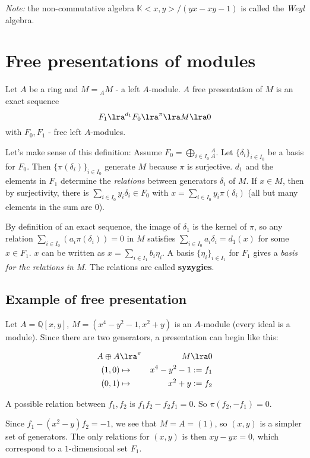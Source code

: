 \textit{Note:} the non-commutative algebra
$\mathbb{K}<x,y>/(yx-xy-1)$ is called the \textit{Weyl} algebra.

\section{Free presentations of modules}
Let $A$ be a ring and $M = {}_AM$ - a left $A$-module.
$A$ free presentation of $M$ is an exact sequence
\begin{equation}\label{eqn:exact-sequence}
F_1 \lra^{d_1} F_0 \lra^{\pi} \lra M \lra 0
\end{equation}
with $F_0, F_1$ - free left $A$-modules.

Let's make sense of this definition:
Assume $F_0 = \bigoplus_{i\in I_0}{}_A^A$.
Let $\{\delta_i\}_{i\in I_0}$ be a basis for $F_0$.
Then $\{\pi(\delta_i)\}_{i\in I_0}$ generate
$M$ because $\pi$ is surjective.
$d_1$ and the elements in $F_1$ determine the 
\textit{relations} between generators $\delta_i$ of $M$.
If $x\in M$, then by surjectivity, there is 
$\sum_{i\in I_0} y_i \delta_i \in F_0$ with
$x = \sum_{i\in I_0} y_i \pi(\delta_i)$
(all but many elements in the sum are $0$).

By definition of an exact sequence, the image of $\delta_1$
is the kernel of $\pi$, so any relation 
$\sum_{i\in I_0} (a_i \pi(\delta_i)) = 0 $ in $M$
satisfies $\sum_{i\in I_0} a_i \delta_i = d_1(x)$
for some $x\in F_1$.
$x$ can be written as $x = \sum_{i\in I_1} b_i \eta_i$.
A basis $\{\eta_i\}_{i\in I_1}$
for $F_1$ gives a \textit{basis for the relations in $M$}.
The relations are called \textbf{syzygies}.

\subsection{Example of free presentation}
Let $A = \mathbb{Q}[x, y]$, $M = (x^4-y^2-1, x^2+y)$
is an $A$-module (every ideal is a module). Since there
are two generators, a presentation can begin like this:

\begin{eqnarray*}
    A \oplus A & \lra^\pi & M \lra 0\\
    (1, 0) & \mapsto & x^4-y^2-1 := f_1\\
    (0, 1) & \mapsto & x^2+y := f_2
\end{eqnarray*}

A possible relation between $f_1, f_2$ is 
$f_1f_2 - f_2f_1=0$. So $\pi(f_2, -f_1) = 0$.

Since $f_1 - (x^2-y)f_2 = -1$, we see that
$M = A = (1)$, so $(x, y)$ is a simpler 
set of generators. The only relations for $(x, y)$
is then $xy-yx=0$, which correspond
to a $1$-dimensional set $F_1$.

